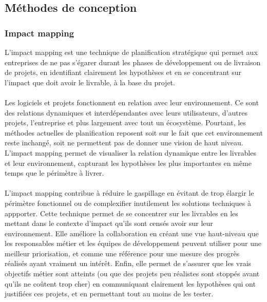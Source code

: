 	\newpage
	\subsection{Méthodes de conception}
		
		\subsubsection{Impact mapping}
L'impact mapping est une technique de planification stratégique qui permet aux entreprises de ne pas s'égarer durant les phases de développement ou de livraison de projets, en identifiant clairement les hypothèses et en se concentrant sur l'impact que doit avoir le livrable, à la base du projet.

\paragraph{} 
Les logiciels et projets fonctionnent en relation avec leur environnement. Ce sont des relations dynamiques et interdépendantes avec leurs utilisateurs, d'autres projets, l'entreprise et plus largement avec tout un écosystème. Pourtant, les méthodes actuelles de planification reposent soit sur le fait que cet environnement reste inchangé, soit ne permettent pas de donner une vision de haut niveau. L'impact mapping permet de visualiser la relation dynamique entre les livrables et leur environnement, capturant les hypothèses les plus importantes en même temps que le périmètre à livrer\cite{Adzi12}.		

\paragraph{}L'impact mapping contribue à réduire le gaspillage en évitant de trop élargir le périmètre fonctionnel ou de complexifier inutilement les solutions techniques à appporter. Cette technique permet de se concentrer sur les livrables en les mettant dans le contexte d'impact qu'ils sont censés avoir sur leur environnement. Elle améliore la collaboration en créant une vue haut-niveau que les responsables métier et les équipes de développement peuvent utiliser pour une meilleur priorisation, et comme une référence pour une mesure des progrès réalisés ayant vraiment un intérêt. Enfin, elle permet de s'assurer que les vrais objectifs métier sont atteints (ou que des projets peu réalistes sont stoppés avant qu'ils ne coûtent trop cher) en communiquant clairement les hypothèses qui ont justifiées ces projets, et en permettant tout au moins de les tester.


